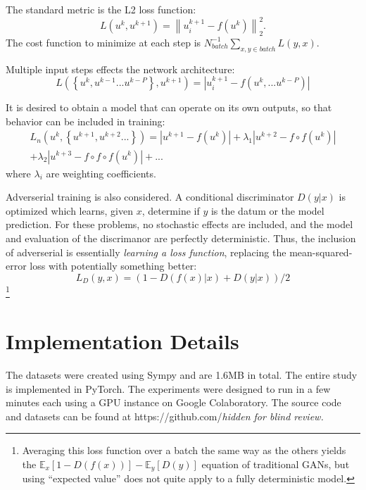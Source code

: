\documentclass{article}
\begin{document}
The standard metric is the L2 loss function:
\begin{equation}
L\left(u^k,u^{k+1}\right) = \left\| u^{k+1}_i-f(u^k) \right\|_2^2.
\end{equation}
The cost function to minimize at each step is $N_{batch}^{-1}\sum_{x,y\in batch} L(y,x)$.

Multiple input steps effects the network architecture:
\begin{equation}
L\left(\left\{u^k,u^{k-1}...u^{k-P}\right\},u^{k+1}\right) = \left| u^{k+1}_i-f(u^k,...u^{k-P}) \right|
\end{equation}

It is desired to obtain a model that can operate on its own outputs, so that behavior can be included in training:
\begin{eqnarray}
L_n\left(u^k,\left\{u^{k+1},u^{k+2}...\right\}\right) =  \left| u^{k+1}-f(u^k) \right| + \lambda_1  \left| u^{k+2}-f \circ f(u^k) \right| \nonumber \\+ \lambda_2  \left| u^{k+3}-f \circ f \circ f(u^k) \right| + ...
\end{eqnarray}
where $\lambda_i$ are weighting coefficients. 

Adverserial training is also considered. A conditional discriminator $D(y|x)$ is optimized which learns, given $x$, determine if $y$ is the datum or the model prediction. For these problems, no stochastic effects are included, and the model and evaluation of the discrimanor are perfectly deterministic. Thus, the inclusion of adverserial is essentially {\em learning a loss function}, replacing the mean-squared-error loss with potentially something better:
\begin{equation}
L_D(y,x)= \left(1 - D\left(f(x)|x\right) + D\left(y|x\right)\right)/2
\end{equation}
\footnote{Averaging this loss function over a batch the same way as the others yields the $\mathbb{E}_x[1-D(f(x))]-\mathbb{E}_y[D(y)]$ equation of traditional GANs, but using ``expected value'' does not quite apply to a fully deterministic model.}

\section{Implementation Details}

The datasets were created using Sympy and are 1.6MB in total. The entire study is implemented in PyTorch. The experiments were designed to run in a few minutes each using a GPU instance on Google Colaboratory. The source code and datasets can be found at https://github.com/{\em hidden for blind review.}
\end{document}
